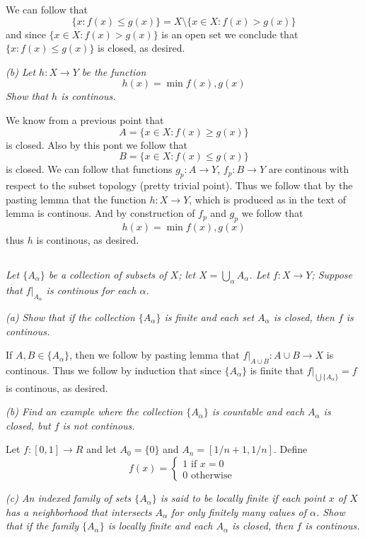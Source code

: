 \documentclass[11pt,oneside,titlepage]{book}
\newcommand{\set}[1]{\{ #1 \}}
\begin{document}
We can follow that
$$\set{x: f(x) \leq g(x)} = X \setminus \set{x \in X: f(x) > g(x)}$$
and since $\set{x \in X: f(x) > g(x)}$ is an open set we conclude that $\set{x: f(x) \leq g(x)}$
is closed, as desired.

\textit{(b) Let $h: X \to Y$ be the function
  $$h(x) = \min{f(x), g(x)}$$
  Show that $h$ is continous.
}

We know from a previous point that
$$A = \set{x \in X: f(x) \geq g(x)}$$
is closed. Also by this pont we follow that
$$B = \set{x \in X: f(x) \leq g(x)}$$
is closed. We can follow that functions
$g_p: A \to Y$, $f_p: B \to Y$ are continous with respect to the subset topology (pretty trivial
point).
Thus we follow that by the pasting lemma that the function $h: X \to Y$,
which is produced as in the text of lemma is continous. And by construction of $f_p$
and $g_p$ we follow that
$$h(x) = \min{f(x), g(x)}$$
thus $h$ is continous, as desired.

\subsection{}

\textit{Let $\set{A_\alpha}$ be a collection of subsets of $X$; let $X = \bigcup_\alpha{A_\alpha}$.
  Let $f: X \to Y$; Suppose that $f|_{A_\alpha}$ is continous for each $\alpha$.}

\textit{(a) Show that if the collection $\set{A_\alpha}$ is finite and each set $A_\alpha$ is
  closed, then $f$ is continous.}

If $A, B \in \set{A_\alpha}$, then we follow by pasting lemma that $f|_{A \cup B}: A \cup B \to X$
is continous. Thus we follow by induction that since $\set{A_\alpha}$ is finite that
$f|_{\bigcup{\set{A_\alpha}}} = f$ is continous, as desired.

\textit{(b) Find an example where the collection $\set{A_\alpha}$ is countable and each $A_\alpha$
  is closed, but $f$ is not continous.}

Let $f: [0, 1] \to R$ and let $A_0 = \set{0}$ and  $A_n = [1/n + 1, 1/n]$. Define
$$f(x) =
\begin{cases}
  1 \text{ if } x = 0 \\ 
  0 \text{ otherwise }
\end{cases}
$$

\textit{(c) An indexed family of sets $\set{A_\alpha}$ is said to be locally finite if each
  point $x$ of $X$ has a neighborhood that intersects $A_\alpha$ for only finitely many values
  of $\alpha$. Show that if the family $\set{A_\alpha}$ is locally finite and each $A_\alpha$
  is closed, then $f$ is continous.}
\end{document}
